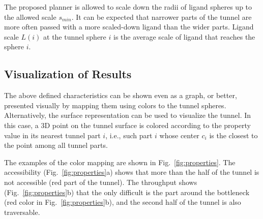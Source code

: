 \documentclass[letterpaper, 10 pt, conference]{ieeeconf} %
\def\smin{s_{min}}
\begin{document}
The proposed planner is allowed to scale down the radii of ligand spheres up to the allowed scale $\smin$. 
It can be expected that narrower parts of the tunnel are more often passed with a more scaled-down ligand than
the wider parts.
Ligand scale $L(i)$ at the tunnel sphere $i$ is the average scale of ligand that reaches the sphere $i$.



\subsection{Visualization of Results}

The above defined characteristics can be shown even as a graph, or better, presented visually by mapping them using colors to the tunnel spheres.
 Alternatively, the surface representation can be used to visualize the tunnel.
In this case, a 3D point on the tunnel surface is colored according to the property value in its nearest tunnel part $i$,  i.e., such part $i$ whose center $c_i$ is the closest to the point among all tunnel parts.

The examples of the color mapping are shown in Fig.~\ref{fig:properties}.
The accessibility (Fig.~\ref{fig:properties}a) shows that more than the half of the tunnel is not accessible (red part of the tunnel).
The throughput shows (Fig.~\ref{fig:properties}b) that the only difficult is the part around the bottleneck (red color in Fig.~\ref{fig:properties}b), and the second half of the tunnel is also traversable.
\end{document}
